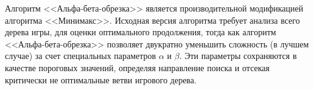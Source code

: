 Алгоритм <<Альфа-бета-обрезка>> является производительной модификацией алгоритма <<Минимакс>>. Исходная версия алгоритма требует анализа всего дерева игры, для оценки оптимального продолжения, тогда как алгоритм <<Альфа-бета-обрезка>> позволяет двукратно уменьшить сложность (в лучшем случае) за счет специальных параметров $\alpha$ и $\beta$. Эти параметры сохраняются в качестве пороговых значений, определяя направление поиска и отсекая критически не оптимальные ветви игрового дерева.
